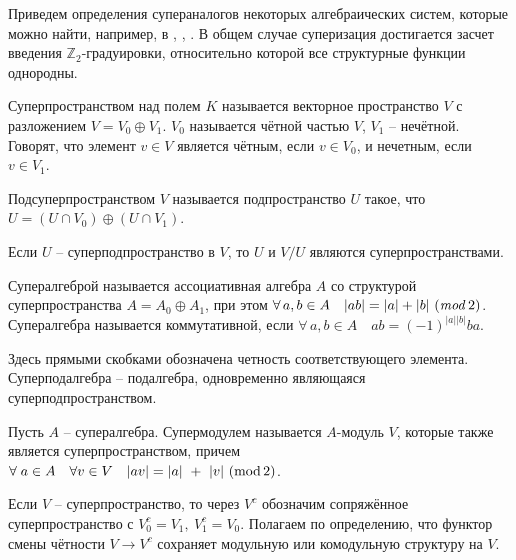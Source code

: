 
Приведем определения супераналогов некоторых алгебраических систем, которые можно найти, 
например, в \cite{donkin}, \cite{some_properties_supergroups}, \cite{la_scala}.
В общем случае суперизация достигается 
засчет введения $\mathbb{Z}_2$-градуировки, относительно которой все структурные функции однородны.

\begin{definition}
Суперпространством над полем $K$ называется векторное пространство $V$ с разложением $ V = V_0 \oplus V_1 $. $V_0$ называется чётной частью $V$, $V_1$ -- нечётной. 
Говорят, что элемент $v \in V$ является чётным, если $v \in V_0$, и нечетным, если $v \in V_1$.
\end{definition}
\begin{definition}
Подсуперпространством $V$ называется подпространство $U$ такое, что $ U = (U \cap V_0) \oplus (U \cap V_1) $.
\end{definition}
Если $U$ -- суперподпространство в $V$, то $U$ и $V/U$ являются суперпространствами.
\begin{definition}
Супералгеброй называется ассоциативная алгебра $A$ со структурой суперпространства $ A = A_0 \oplus A_1 $, 
при этом $ \forall\, a,b \in A \quad |ab| = |a| + |b| ~(\mbox{\textit{mod}}\,2) $.
Супералгебра называется коммутативной, если $ \forall\, a,b \in A \quad ab = (-1)^{|a| |b|} ba $.
\end{definition}
Здесь прямыми скобками обозначена четность соответствующего элемента.
Суперподалгебра -- подалгебра, одновременно являющаяся суперподпространством. 
\begin{definition}
Пусть $A$ -- супералгебра. Супермодулем называется $A$-модуль $V$, которые также является суперпространством, 
причем $ \forall \; a \in A \quad \forall v \in V \quad |av| = |a| ~+ ~|v| ~(\mbox{\textup{mod}}\,2) $.
\end{definition}
\begin{definition}
Если $V$ -- суперпространство, то через $V^c$ обозначим сопряжённое суперпространство с $V_0^c = V_1, \: V_1^c = V_0 $.
Полагаем по определению, что функтор смены чётности $ V \rightarrow V^c $ сохраняет модульную или комодульную структуру на $V$.
\end{definition}
